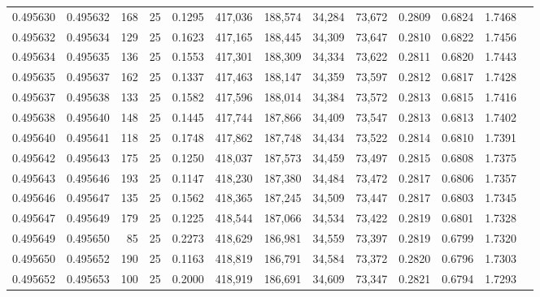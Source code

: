 \begin{tabular}{rrrrrrrrrrrrr}
0.495630 & 0.495632 &   168 &  25 &                                     0.1295 & 417,036 & 188,574 &  34,284 &  73,672 & 0.2809 & 0.6824 & 1.7468 \\
0.495632 & 0.495634 &   129 &  25 &                                     0.1623 & 417,165 & 188,445 &  34,309 &  73,647 & 0.2810 & 0.6822 & 1.7456 \\
0.495634 & 0.495635 &   136 &  25 &                                     0.1553 & 417,301 & 188,309 &  34,334 &  73,622 & 0.2811 & 0.6820 & 1.7443 \\
0.495635 & 0.495637 &   162 &  25 &                                     0.1337 & 417,463 & 188,147 &  34,359 &  73,597 & 0.2812 & 0.6817 & 1.7428 \\
0.495637 & 0.495638 &   133 &  25 &                                     0.1582 & 417,596 & 188,014 &  34,384 &  73,572 & 0.2813 & 0.6815 & 1.7416 \\
0.495638 & 0.495640 &   148 &  25 &                                     0.1445 & 417,744 & 187,866 &  34,409 &  73,547 & 0.2813 & 0.6813 & 1.7402 \\
0.495640 & 0.495641 &   118 &  25 &                                     0.1748 & 417,862 & 187,748 &  34,434 &  73,522 & 0.2814 & 0.6810 & 1.7391 \\
0.495642 & 0.495643 &   175 &  25 &                                     0.1250 & 418,037 & 187,573 &  34,459 &  73,497 & 0.2815 & 0.6808 & 1.7375 \\
0.495643 & 0.495646 &   193 &  25 &                                     0.1147 & 418,230 & 187,380 &  34,484 &  73,472 & 0.2817 & 0.6806 & 1.7357 \\
0.495646 & 0.495647 &   135 &  25 &                                     0.1562 & 418,365 & 187,245 &  34,509 &  73,447 & 0.2817 & 0.6803 & 1.7345 \\
0.495647 & 0.495649 &   179 &  25 &                                     0.1225 & 418,544 & 187,066 &  34,534 &  73,422 & 0.2819 & 0.6801 & 1.7328 \\
0.495649 & 0.495650 &    85 &  25 &                                     0.2273 & 418,629 & 186,981 &  34,559 &  73,397 & 0.2819 & 0.6799 & 1.7320 \\
0.495650 & 0.495652 &   190 &  25 &                                     0.1163 & 418,819 & 186,791 &  34,584 &  73,372 & 0.2820 & 0.6796 & 1.7303 \\
0.495652 & 0.495653 &   100 &  25 &                                     0.2000 & 418,919 & 186,691 &  34,609 &  73,347 & 0.2821 & 0.6794 & 1.7293 \\

\end{tabular}

